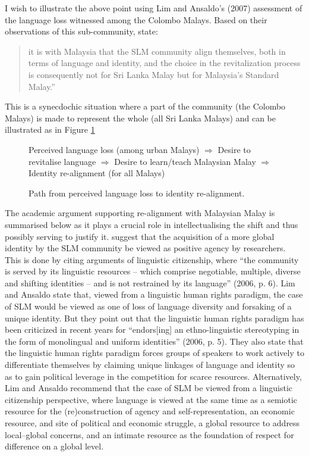 I wish to illustrate the above point using Lim and Ansaldo's (2007) assessment of the language loss witnessed among the Colombo Malays. Based on their observations of this sub-community, \citet{LimEtAl2007} state: 

\begin{quote}
it is with Malaysia that the SLM community align themselves, both in terms of language and identity, and the choice in the revitalization process is consequently not for Sri Lanka Malay but for Malaysia's Standard Malay.'' \citep[233]{LimEtAl2007}
\end{quote}


This is a synecdochic situation where a part of the community (the Colombo Malays) is made to represent the whole (all Sri Lanka Malays) and can be illustrated as in Figure \ref{rassool:fig:1}

\begin{figure}

Perceived language loss (among urban Malays) $\Longrightarrow$    Desire to revitalise language $\Longrightarrow$   Desire to learn/teach Malaysian Malay 	$\Longrightarrow$	Identity re-alignment (for all Malays) 
 
\caption{Path from perceived language loss to identity re-alignment.}
\label{rassool:fig:1}
\end{figure}


The academic argument supporting re-alignment with Malaysian Malay is summarised below as it plays a crucial role in intellectualising the shift and thus possibly serving to justify it. \citet{LimEtAl2006} suggest that the acquisition of a more global identity by the SLM community be viewed as positive agency by researchers. This is done by citing arguments of linguistic citizenship, where ``the community is served by its linguistic resources -- which comprise negotiable, multiple, diverse and shifting identities -- and is not restrained by its language'' (2006, p. 6). Lim and Ansaldo state that, viewed from a linguistic human rights paradigm, the case of SLM would be viewed as one of loss of language diversity and forsaking of a unique identity. But they point out that the linguistic human rights paradigm has been criticized in recent years for ``endors[ing] an ethno-linguistic stereotyping in the form of monolingual and uniform identities'' (2006, p. 5). They also state that the linguistic human rights paradigm forces groups of speakers to work actively to differentiate themselves by claiming unique linkages of language and identity so as to gain political leverage in the competition for scarce resources. Alternatively, Lim and Ansaldo recommend that the case of SLM be viewed from a linguistic citizenship perspective, where language is viewed at the same time as a semiotic resource for the (re)construction of agency and self-representation, an economic resource, and site of political and economic struggle, a global resource to address local{}--global concerns, and an intimate resource as the foundation of respect for difference on a global level.

